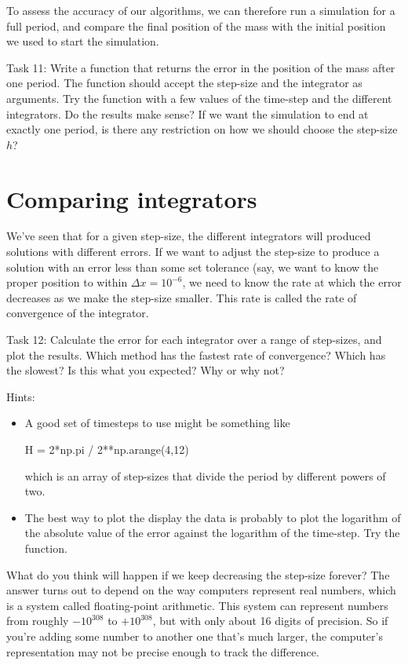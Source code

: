 \documentclass[main.tex]{subfiles}
\begin{document}
To assess the accuracy of our algorithms, we can therefore run a simulation for a full period, and compare the final position of the mass with the initial position we used to start the simulation.

Task 11:
Write a function that returns the error in the position of the mass after one period.
The function should accept the step-size and the integrator as arguments.
Try the function with a few values of the time-step and the different integrators.
Do the results make sense?
If we want the simulation to end at exactly one period, is there any restriction on how we should choose the step-size $h$?

\section{Comparing integrators}

We've seen that for a given step-size, the different integrators will produced solutions with different errors.
If we want to adjust the step-size to produce a solution with an error less than some set tolerance (say, we want to know the proper position to within $\Delta x = 10^{-6}$, we need to know the rate at which the error decreases as we make the step-size smaller.
This rate is called the rate of convergence of the integrator.

Task 12:
Calculate the error for each integrator over a range of step-sizes, and plot the results.
Which method has the fastest rate of convergence?
Which has the slowest?
Is this what you expected?
Why or why not?

Hints:
\begin{itemize}
\item A good set of timesteps to use might be something like
\begin{python}
 H = 2*np.pi / 2**np.arange(4,12)
\end{python}
which is an array of step-sizes that divide the period by different powers of two.
\item The best way to plot the display the data is probably to plot the logarithm of the absolute value of the error against the logarithm of the time-step.
Try the  function.
\end{itemize}

What do you think will happen if we keep decreasing the step-size forever?
The answer turns out to depend on the way computers represent real numbers, which is a system called floating-point arithmetic.
This system can represent numbers from roughly $-10^{308}$ to $+10^{308}$, but with only about 16 digits of precision.
So if you're adding some number to another one that's much larger, the computer's representation may not be precise enough to track the difference.
\end{document}
